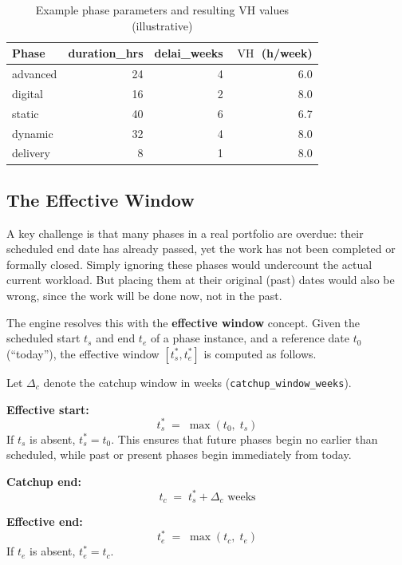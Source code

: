 \documentclass[12pt,a4paper]{report}
\DeclareMathOperator{\vh}{VH}
\begin{document}
\begin{table}[H]
\centering
\caption{Example phase parameters and resulting VH values (illustrative)}
\begin{tabular}{@{} l r r r @{}}
\toprule
\textbf{Phase} & \textbf{duration\_hrs} & \textbf{delai\_weeks} & $\vh$ (h/week) \\
\midrule
advanced  & 24 & 4 & 6.0 \\
digital   & 16 & 2 & 8.0 \\
static    & 40 & 6 & 6.7 \\
dynamic   & 32 & 4 & 8.0 \\
delivery  &  8 & 1 & 8.0 \\
\bottomrule
\end{tabular}
\end{table}

\subsection{The Effective Window}
\label{sec:effective-window}

A key challenge is that many phases in a real portfolio are overdue:
their scheduled end date has already passed, yet the work has not
been completed or formally closed. Simply ignoring these phases
would undercount the actual current workload. But placing them at
their original (past) dates would also be wrong, since the work will
be done now, not in the past.

The engine resolves this with the \textbf{effective window} concept.
Given the scheduled start $t_s$ and end $t_e$ of a phase instance,
and a reference date $t_0$ (``today''), the effective window
$[t_s^*, t_e^*]$ is computed as follows.

\begin{tcolorbox}[defbox, title={Definition: Effective Window}]
Let $\Delta_c$ denote the catchup window in weeks
(\texttt{catchup\_window\_weeks}).

\medskip
\textbf{Effective start:}
\[
  t_s^* \;=\; \max(t_0,\; t_s)
\]
If $t_s$ is absent, $t_s^* = t_0$. This ensures that future
phases begin no earlier than scheduled, while past or present
phases begin immediately from today.

\medskip
\textbf{Catchup end:}
\[
  t_c \;=\; t_s^* + \Delta_c \text{ weeks}
\]

\textbf{Effective end:}
\[
  t_e^* \;=\; \max(t_c,\; t_e)
\]
If $t_e$ is absent, $t_e^* = t_c$.
\end{tcolorbox}
\end{document}
